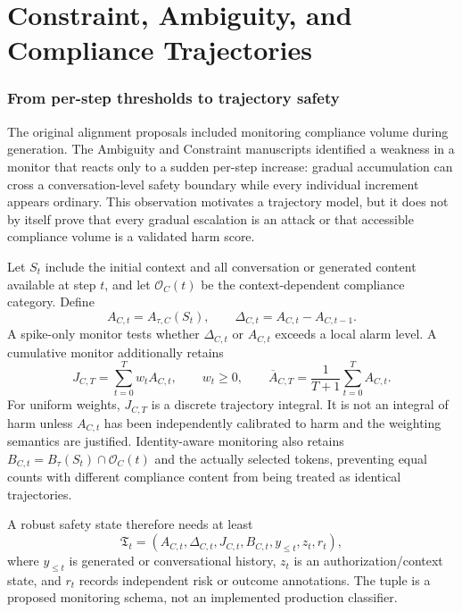 \clearpage
\part{Constraint, Ambiguity, and Compliance Trajectories}
\label{part:safety}

\section{From per-step thresholds to trajectory safety}
The original alignment proposals included monitoring compliance volume during generation. The Ambiguity and Constraint manuscripts identified a weakness in a monitor that reacts only to a sudden per-step increase: gradual accumulation can cross a conversation-level safety boundary while every individual increment appears ordinary. This observation motivates a trajectory model, but it does not by itself prove that every gradual escalation is an attack or that accessible compliance volume is a validated harm score.

Let $S_t$ include the initial context and all conversation or generated content available at step $t$, and let $\mathcal O_C(t)$ be the context-dependent compliance category. Define
\begin{equation}
A_{C,t}=A_{\tau,C}(S_t),\qquad
\Delta_{C,t}=A_{C,t}-A_{C,t-1}.
\label{eq:compliance-trajectory}
\end{equation}
A spike-only monitor tests whether $\Delta_{C,t}$ or $A_{C,t}$ exceeds a local alarm level. A cumulative monitor additionally retains
\begin{equation}
J_{C,T}=\sum_{t=0}^{T}w_tA_{C,t},\qquad w_t\geq0,
\qquad \overline A_{C,T}=\frac{1}{T+1}\sum_{t=0}^{T}A_{C,t}.
\label{eq:trajectory-integral}
\end{equation}
For uniform weights, $J_{C,T}$ is a discrete trajectory integral. It is not an integral of harm unless $A_{C,t}$ has been independently calibrated to harm and the weighting semantics are justified. Identity-aware monitoring also retains $B_{C,t}=B_\tau(S_t)\cap\mathcal O_C(t)$ and the actually selected tokens, preventing equal counts with different compliance content from being treated as identical trajectories.

A robust safety state therefore needs at least
\begin{equation}
\mathfrak T_t=(A_{C,t},\Delta_{C,t},J_{C,t},B_{C,t},y_{\leq t},z_t,r_t),
\end{equation}
where $y_{\leq t}$ is generated or conversational history, $z_t$ is an authorization/context state, and $r_t$ records independent risk or outcome annotations. The tuple is a proposed monitoring schema, not an implemented production classifier.

